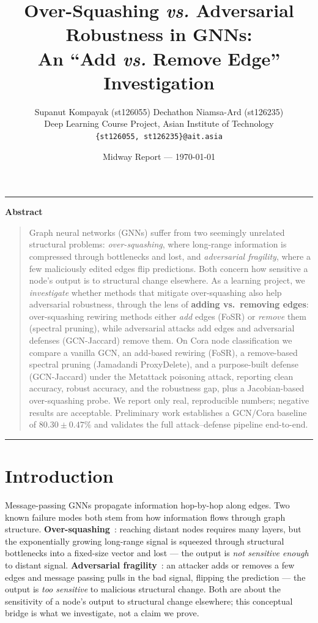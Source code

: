 \documentclass[10pt]{article}
\title{\textbf{Over-Squashing {\itshape vs.} Adversarial Robustness in GNNs:\\
An ``Add {\itshape vs.} Remove Edge'' Investigation}}
\author{
  Supanut Kompayak (st126055) \quad Dechathon Niamsa-Ard (st126235)\\
  Deep Learning Course Project, Asian Institute of Technology\\
  \texttt{\{st126055, st126235\}@ait.asia}
}
\date{Midway Report --- \today}
\renewenvironment{abstract}{%
  \vspace{0.5em}\begin{center}\rule{\textwidth}{0.5pt}\end{center}\vspace{-0.3em}
  {\centering\textbf{Abstract}\par}\vspace{0.3em}
  \begin{quote}\small}{%
  \end{quote}\vspace{-0.3em}\begin{center}\rule{\textwidth}{0.5pt}\end{center}}
\begin{document}
\maketitle

\begin{abstract}
Graph neural networks (GNNs) suffer from two seemingly unrelated structural problems:
\emph{over-squashing}, where long-range information is compressed through bottlenecks and lost,
and \emph{adversarial fragility}, where a few maliciously edited edges flip predictions. Both
concern how sensitive a node's output is to structural change elsewhere. As a learning project, we
\emph{investigate} whether methods that mitigate over-squashing also help adversarial robustness,
through the lens of \textbf{adding vs.\ removing edges}: over-squashing rewiring methods either
\emph{add} edges (FoSR) or \emph{remove} them (spectral pruning), while adversarial attacks add
edges and adversarial defenses (GCN-Jaccard) remove them. On Cora node classification we compare a
vanilla GCN, an add-based rewiring (FoSR), a remove-based spectral pruning (Jamadandi ProxyDelete),
and a purpose-built defense (GCN-Jaccard) under the Metattack poisoning attack, reporting clean
accuracy, robust accuracy, and the robustness gap, plus a Jacobian-based over-squashing probe. We
report only real, reproducible numbers; negative results are acceptable. Preliminary work establishes
a GCN/Cora baseline of $80.30 \pm 0.47\%$ and validates the full attack--defense pipeline end-to-end.
\end{abstract}

\section{Introduction}
Message-passing GNNs propagate information hop-by-hop along edges. Two known failure modes both stem
from how information flows through graph structure. \textbf{Over-squashing}~\citep{alon2021bottleneck,
topping2022understanding,digiovanni2023oversquashing}: reaching distant nodes requires many layers, but
the exponentially growing long-range signal is squeezed through structural bottlenecks into a
fixed-size vector and lost --- the output is \emph{not sensitive enough} to distant signal.
\textbf{Adversarial fragility}~\citep{zugner2019metattack,zugner2018nettack}: an attacker adds or
removes a few edges and message passing pulls in the bad signal, flipping the prediction --- the output
is \emph{too sensitive} to malicious structural change. Both are about the sensitivity of a node's
output to structural change elsewhere; this conceptual bridge is what we investigate, not a claim we
prove.
\end{document}
